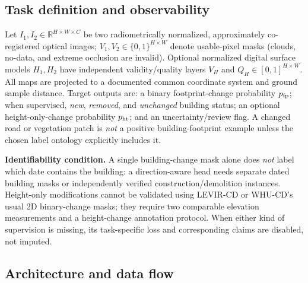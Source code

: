 \subsection{Task definition and observability}

Let $I_1,I_2\in\mathbb{R}^{H\times W\times C}$ be two radiometrically normalized, approximately co-registered optical images; $V_1,V_2\in\{0,1\}^{H\times W}$ denote usable-pixel masks (clouds, no-data, and extreme occlusion are invalid). Optional normalized digital surface models $H_1,H_2$ have independent validity/quality layers $V_H$ and $Q_H\in[0,1]^{H\times W}$. All maps are projected to a documented common coordinate system and ground sample distance. Target outputs are: a binary footprint-change probability $p_{\rm fp}$; when supervised, \emph{new}, \emph{removed}, and \emph{unchanged} building status; an optional height-only-change probability $p_{\rm ht}$; and an uncertainty/review flag. A changed road or vegetation patch is \emph{not} a positive building-footprint example unless the chosen label ontology explicitly includes it.

\textbf{Identifiability condition.} A single building-change mask alone does \emph{not} label which date contains the building: a direction-aware head needs separate dated building masks or independently verified construction/demolition instances. Height-only modifications cannot be validated using LEVIR-CD or WHU-CD's usual 2D binary-change masks; they require two comparable elevation measurements and a height-change annotation protocol. When either kind of supervision is missing, its task-specific loss and corresponding claims are disabled, not imputed.

\subsection{Architecture and data flow}

